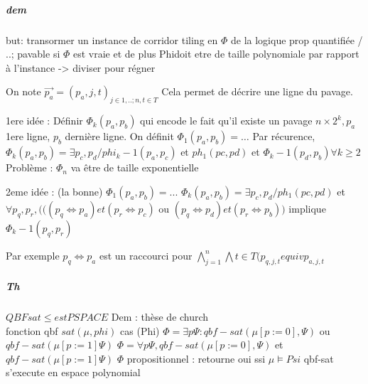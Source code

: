 \documentclass[10pt,a4paper]{article}
\begin{document}
\subparagraph*{dem} 
but:  transormer un instance de corridor tiling en $\Phi$ de la logique prop quantifiée / ..; pavable si $\Phi$ est vraie et de plus Phidoit etre de taille polynomiale par rapport à l'instance -> diviser pour régner

On note $\vec{p_a} = (p_a, j, t)_{j \in { 1, ..; n}, t \in T}$ Cela permet de décrire une ligne du pavage.

1ere idée : Définir $\Phi_k (p_a, p_b)$ qui encode le fait qu'il existe un pavage $n \times 2^k , p_a$ 1ere ligne, $p_b$ dernière ligne.
On définit $\Phi_1 (p_a, p_b) = \dots$
Par récurence, $\Phi_k(p_a, p_b) = \exists p_c, p_d / phi_k-1 (p_a, p_c)$ et $ph_1(pc, pd)$ et $\Phi_k-1(p_d, p_b) \forall k \geq 2$
Problème : $\Phi_n$ va être de taille exponentielle

2eme idée : (la bonne)
$\Phi_1 (p_a, p_b) = ...$
$\Phi_k(p_a, p_b) = \exists p_c, p_d / ph_1(pc, pd)$ et $\forall p_q, p_r , (((p_q \Leftrightarrow p_a) et (p_r \Leftrightarrow p_c)$ ou $(p_q \Leftrightarrow p_d) et (p_r \Leftrightarrow p_b))$ implique $\Phi_k-1 (p_q, p_r)$


Par exemple $p_q \Leftrightarrow p_a$ est un raccourci pour $\bigwedge_{j=1}^n \bigwedge t \in T (p_{q,j,t} equiv p_{a, j, t}$

\subparagraph*{Th} $QBF sat \leqslant est PSPACE$
Dem : thèse de church\\
fonction qbf $sat(\mu, phi)$
	cas  (Phi)
		$\Phi = \exists p \Psi : qbf-sat(\mu [p:=0], \Psi)$ ou $qbf-sat (\mu[p:=1] \Psi)$
		$\Phi = \forall p \Psi, qbf-sat(\mu [p:=0], \Psi)$ et $qbf-sat (\mu[p:=1] \Psi)$
		$\Phi$ propositionnel : retourne oui ssi $\mu \models Psi$
qbf-sat s'execute en espace polynomial
\end{document}
